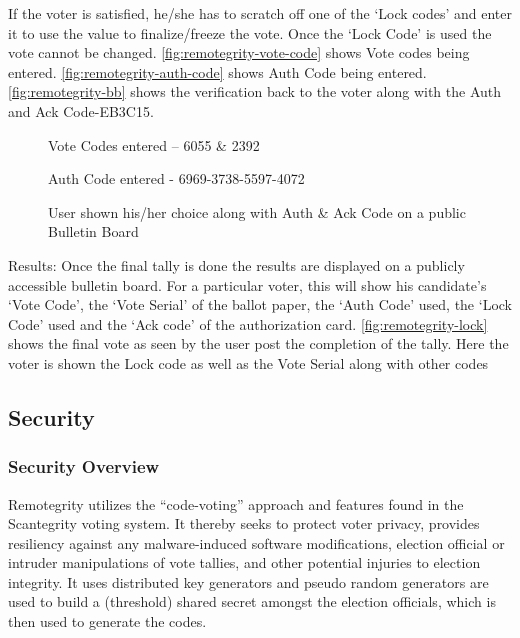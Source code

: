 If the voter is satisfied, he/she has to scratch off one of the `Lock
codes' and enter it to use the value to finalize/freeze the vote. Once
the `Lock Code' is used the vote cannot be
changed. \autoref{fig:remotegrity-vote-code} shows Vote codes being
entered. \autoref{fig:remotegrity-auth-code} shows Auth Code being
entered. \autoref{fig:remotegrity-bb} shows the verification back to
the voter along with the Auth and Ack Code-EB3C15.

\begin{figure}
  \centering {}
  \caption{Vote Codes entered -- 6055 \& 2392}
  \label{fig:remotegrity-vote-code}
\end{figure}

\begin{figure}
  \centering {}
  \caption{Auth Code entered - 6969-3738-5597-4072}
  \label{fig:remotegrity-auth-code}
\end{figure}

\begin{figure}
  \centering {}
  \caption{User shown his/her choice along with Auth \& Ack Code on a
    public Bulletin Board}
  \label{fig:remotegrity-bb}
\end{figure}

Results: Once the final tally is done the results are displayed on a
publicly accessible bulletin board. For a particular voter, this will
show his candidate's `Vote Code', the `Vote Serial' of the ballot
paper, the `Auth Code' used, the `Lock Code' used and the `Ack code'
of the authorization card. \autoref{fig:remotegrity-lock} shows the
final vote as seen by the user post the completion of the tally. Here
the voter is shown the Lock code as well as the Vote Serial along with
other codes

\subsection{Security}

\subsubsection{Security Overview}

Remotegrity utilizes the ``code-voting'' approach and features found
in the Scantegrity voting system. It thereby seeks to protect voter
privacy, provides resiliency against any malware-induced software
modifications, election official or intruder manipulations of vote
tallies, and other potential injuries to election integrity. It uses
distributed key generators and pseudo random generators are used to
build a (threshold) shared secret amongst the election officials,
which is then used to generate the codes.

